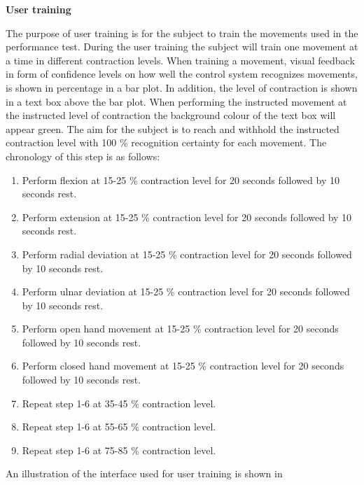 \textbf{User training} %

The purpose of user training is for the subject to train the movements used in the performance test. During the user training the subject will train one movement at a time in different contraction levels. When training a movement, visual feedback in form of confidence levels on how well the control system recognizes movements, is shown in percentage in a bar plot. In addition, the level of contraction is shown in a text box above the bar plot. When performing the instructed movement at the instructed level of contraction the background colour of the text box will appear green. The aim for the subject is to reach and withhold the instructed contraction level with 100 \% recognition certainty for each movement. The chronology of this step is as follows:

\begin{enumerate}
	\item Perform flexion at 15-25 \% contraction level for 20 seconds followed by 10 seconds rest.
	\item Perform extension at 15-25 \% contraction level for 20 seconds followed by 10 seconds rest.
	\item Perform radial deviation at 15-25 \% contraction level for 20 seconds followed by 10 seconds rest.
	\item Perform ulnar deviation at 15-25 \% contraction level for 20 seconds followed by 10 seconds rest.
	\item Perform open hand movement at 15-25 \% contraction level for 20 seconds followed by 10 seconds rest.
	\item Perform closed hand movement at 15-25 \% contraction level for 20 seconds followed by 10 seconds rest.
	\item Repeat step 1-6 at 35-45 \% contraction level.
	\item Repeat step 1-6 at 55-65 \% contraction level.
	\item Repeat step 1-6 at 75-85 \% contraction level.
\end{enumerate} 

An illustration of the interface used for user training is shown in 

